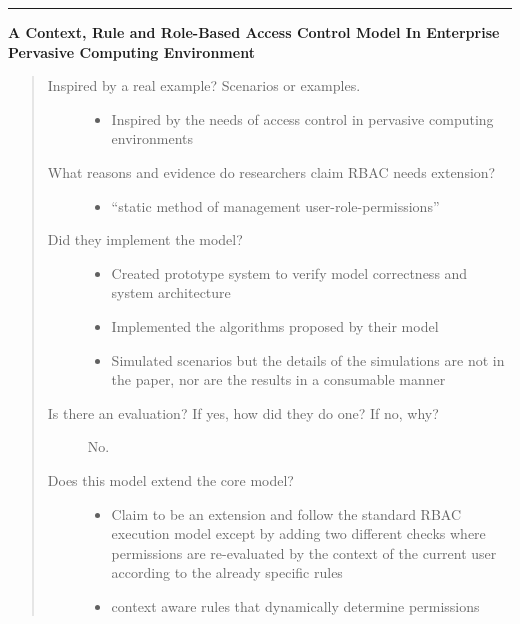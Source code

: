 \documentclass[letterpaper,10pt,english]{sphinxmanual}
\begin{document}
\bigskip\hrule{}\bigskip


\textbf{A Context, Rule and Role-Based Access Control Model In Enterprise Pervasive Computing Environment}
\begin{quote}
\begin{description}
\item[{Inspired by a real example? Scenarios or examples.}] \leavevmode\begin{itemize}
\item {} 
Inspired by the needs of access control in pervasive computing environments

\end{itemize}

\item[{What reasons and evidence do researchers claim RBAC needs extension?}] \leavevmode\begin{itemize}
\item {} 
``static method of management user-role-permissions''

\end{itemize}

\item[{Did they implement the model?}] \leavevmode\begin{itemize}
\item {} 
Created prototype system to verify model correctness and system architecture

\item {} 
Implemented the algorithms proposed by their model

\item {} 
Simulated scenarios but the details of the simulations are not in the paper, nor are the results in a consumable manner

\end{itemize}

\item[{Is there an evaluation? If yes, how did they do one? If no, why?}] \leavevmode
No.

\item[{Does this model extend the core model?}] \leavevmode\begin{itemize}
\item {} 
Claim to be an extension and follow the standard RBAC execution model except by adding two different checks where permissions are re-evaluated by the context of the current user according to the already specific rules

\item {} 
context aware rules that dynamically determine permissions


\end{itemize}
\end{description}
\end{quote}
\end{document}
